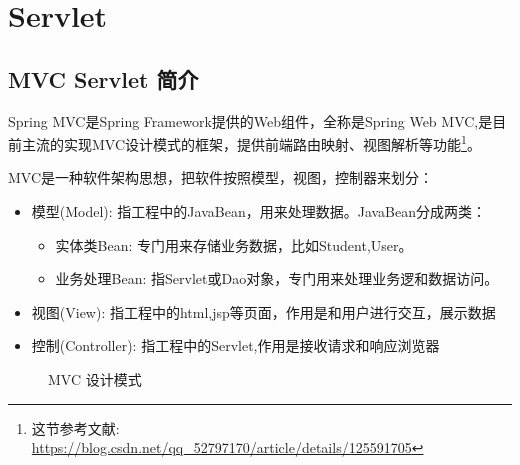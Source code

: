 \section{Servlet}

\subsection{MVC Servlet 简介}

Spring MVC是Spring Framework提供的Web组件，全称是Spring Web MVC,是目前主流的实现MVC设计模式的框架，提供前端路由映射、视图解析等功能\footnote{这节参考文献: \url{https://blog.csdn.net/qq_52797170/article/details/125591705}}。

MVC是一种软件架构思想，把软件按照模型，视图，控制器来划分：
\begin{itemize}
    \item 模型(Model): 指工程中的JavaBean，用来处理数据。JavaBean分成两类：
    \begin{itemize}
        \item 实体类Bean: 专门用来存储业务数据，比如Student,User。
        \item 业务处理Bean: 指Servlet或Dao对象，专门用来处理业务逻和数据访问。
    \end{itemize}
    \item 视图(View): 指工程中的html,jsp等页面，作用是和用户进行交互，展示数据
    \item 控制(Controller): 指工程中的Servlet,作用是接收请求和响应浏览器
\end{itemize}

\begin{figure}[H]
    \small
    \centering
    \caption{MVC 设计模式}
    \label{fig:MVC 设计模式}
\end{figure}

